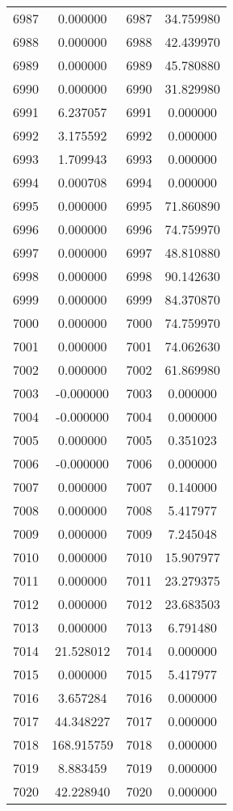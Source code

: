 \documentclass[12pt]{article}
\begin{document}
\begin{longtable}{@{}cccc@{}}
6987 & 0.000000 & 6987 & 34.759980 \\
6988 & 0.000000 & 6988 & 42.439970 \\
6989 & 0.000000 & 6989 & 45.780880 \\
6990 & 0.000000 & 6990 & 31.829980 \\
6991 & 6.237057 & 6991 & 0.000000 \\
6992 & 3.175592 & 6992 & 0.000000 \\
6993 & 1.709943 & 6993 & 0.000000 \\
6994 & 0.000708 & 6994 & 0.000000 \\
6995 & 0.000000 & 6995 & 71.860890 \\
6996 & 0.000000 & 6996 & 74.759970 \\
6997 & 0.000000 & 6997 & 48.810880 \\
6998 & 0.000000 & 6998 & 90.142630 \\
6999 & 0.000000 & 6999 & 84.370870 \\
7000 & 0.000000 & 7000 & 74.759970 \\
7001 & 0.000000 & 7001 & 74.062630 \\
7002 & 0.000000 & 7002 & 61.869980 \\
7003 & -0.000000 & 7003 & 0.000000 \\
7004 & -0.000000 & 7004 & 0.000000 \\
7005 & 0.000000 & 7005 & 0.351023 \\
7006 & -0.000000 & 7006 & 0.000000 \\
7007 & 0.000000 & 7007 & 0.140000 \\
7008 & 0.000000 & 7008 & 5.417977 \\
7009 & 0.000000 & 7009 & 7.245048 \\
7010 & 0.000000 & 7010 & 15.907977 \\
7011 & 0.000000 & 7011 & 23.279375 \\
7012 & 0.000000 & 7012 & 23.683503 \\
7013 & 0.000000 & 7013 & 6.791480 \\
7014 & 21.528012 & 7014 & 0.000000 \\
7015 & 0.000000 & 7015 & 5.417977 \\
7016 & 3.657284 & 7016 & 0.000000 \\
7017 & 44.348227 & 7017 & 0.000000 \\
7018 & 168.915759 & 7018 & 0.000000 \\
7019 & 8.883459 & 7019 & 0.000000 \\
7020 & 42.228940 & 7020 & 0.000000 \\

\end{longtable}
\end{document}
